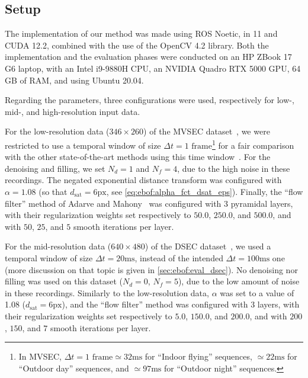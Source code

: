\subsection{Setup}\label{sec:ebof:setup}
The implementation of our method was made using ROS Noetic, in \CC{}11 and CUDA 12.2, combined with the use of the OpenCV 4.2 library. Both the implementation and the evaluation phases were conducted on an HP ZBook 17 G6 laptop, with an Intel i9-9880H CPU, an NVIDIA Quadro RTX 5000 GPU, 64 GB of RAM, and using Ubuntu 20.04.

Regarding the parameters, three configurations were used, respectively for low-, mid-, and high-resolution input data.

For the low-resolution data (\(346\times260\)) of the MVSEC dataset~\cite{Zhu2018EVFlowNetSO,Zhu2018TheMS}, we were restricted to use a temporal window of size \(\Delta t = 1\text{ frame}\)\footnote{In MVSEC, \(\Delta t = 1\text{ frame} \simeq 32\text{ms}\) for ``Indoor flying'' sequences, \(\simeq 22\text{ms}\) for ``Outdoor day'' sequences, and \(\simeq 97\text{ms}\) for ``Outdoor night'' sequences.} for a fair comparison with the other state-of-the-art methods using this time window~\cite{Zhu2019UnsupervisedEL,Zhu2018EVFlowNetSO,ParedesValls2021SelfSupervisedLO,Gehrig2021DenseOF,ParedesValls2021BackTE,Lee2020SpikeFlowNetEO,Akolkar2020SeeBY,Stoffregen2020ReducingTS}. For the denoising and filling, we set \(N_d = 1\) and \(N_f = 4\), due to the high noise in these recordings. The negated exponential distance transform was configured with \(\alpha = 1.08\) (so that \(d_\text{sat} = 6\text{px}\), see \cref{eq:ebof:alpha_fct_dsat_eps}). Finally, the ``flow filter'' method of Adarve and Mahony~\cite{Adarve2016AFF} was configured with 3 pyramidal layers, with their regularization weights set respectively to \(50.0\), \(250.0\), and \(500.0\), and with \(50\), \(25\), and \(5\) smooth iterations per layer.

For the mid-resolution data (\(640\times480\)) of the DSEC dataset~\cite{Gehrig2021DSECAS}, we used a temporal window of size \(\Delta t = 20\text{ms}\), instead of the intended \(\Delta t = 100\text{ms}\) one (more discussion on that topic is given in \cref{sec:ebof:eval_dsec}). No denoising nor filling was used on this dataset (\(N_d = 0\), \(N_f = 5\)), due to the low amount of noise in these recordings. Similarly to the low-resolution data, \(\alpha\) was set to a value of 1.08 (\(d_\text{sat} = 6\text{px}\)), and the ``flow filter'' method was configured with 3 layers, with their regularization weights set respectively to \(5.0\), \(150.0\), and \(200.0\), and with \(200\), \(150\), and \(7\) smooth iterations per layer.


